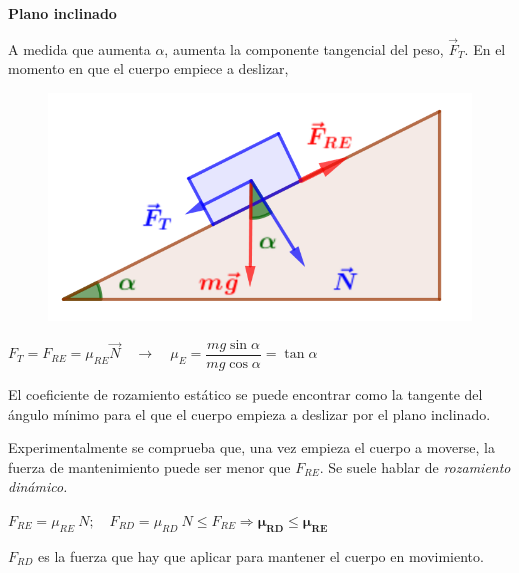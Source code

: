 \textbf{Plano inclinado}
		
\begin{multicols}{2}
A medida que aumenta $\alpha$, aumenta la componente tangencial del peso, $\vec F_T$. En el momento en que el cuerpo empiece a deslizar,

\begin{figure}[H]
		\centering
		\includegraphics[width=.35\textwidth]{imagenes/imagenes03/T03IM49.png}
		\end{figure}		
\end{multicols}			
		
$F_T=F_{RE}=\mu_{RE}\vec N \quad \to \quad \mu_E=\dfrac {m g \sin \alpha}{m g \cos \alpha}=\tan \alpha$

El coeficiente de rozamiento estático se puede encontrar como la tangente del ángulo mínimo para el que el cuerpo empieza a deslizar por el plano inclinado.

Experimentalmente se comprueba que, una vez empieza el cuerpo a moverse, la fuerza de mantenimiento puede ser menor que $F_{RE}$. Se suele hablar de \emph{rozamiento dinámico.}

$F_{RE}=\mu_{RE}\ N; \quad F_{RD}=\mu_{RD}\ N \le F_{RE} \Rightarrow \boldsymbol{\mu_{RD} \le \mu_{RE}}$		
		
$F_{RD}$ es la fuerza que hay que aplicar para mantener el cuerpo en movimiento.			



